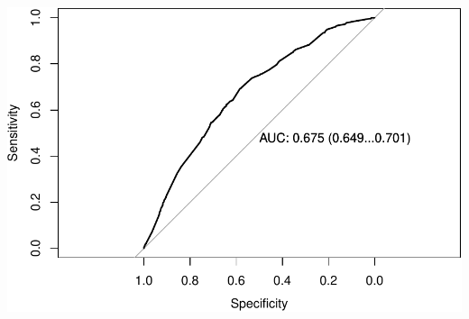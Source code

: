 \documentclass[11pt,]{article}
\begin{document}
\includegraphics{report2_files/figure-latex/plot-hac2011-males-4.pdf}
\end{document}
